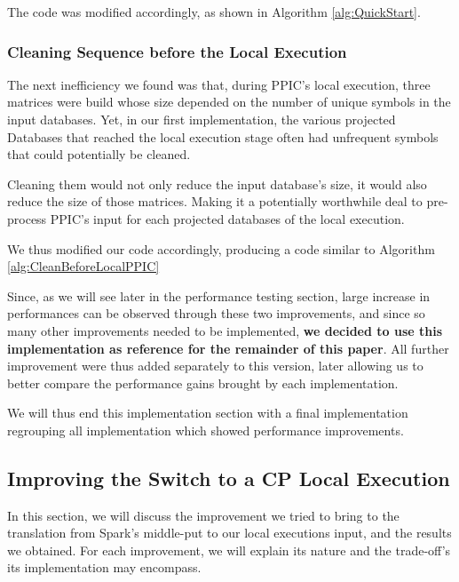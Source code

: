 \documentclass{eplmastersthesis}
\begin{document}
The code was modified accordingly, as shown in Algorithm \ref{alg:QuickStart}.

\subsubsection{Cleaning Sequence before the Local Execution}

The next inefficiency we found was that, during PPIC's local execution, three matrices were build whose size depended on the number of  unique symbols in the input databases.
Yet, in our first implementation, the various projected Databases that reached the local execution stage often had unfrequent symbols that could potentially be cleaned. \newline

Cleaning them would not only reduce the input database's size, it would also reduce the size of those matrices. Making it a potentially worthwhile deal to pre-process PPIC's input for each projected databases of the local execution. \newline

We thus modified our code accordingly, producing a code similar to Algorithm \ref{alg:CleanBeforeLocalPPIC} \newline

Since, as we will see later in the performance testing section, large increase in performances can be observed through these two improvements, and since so many other improvements needed to be implemented, \textbf{we decided to use this implementation as reference for the remainder of this paper}. All further improvement were thus added separately to this version, later allowing us to better compare the performance gains brought by each implementation. \newline

We will thus end this implementation section with a final implementation regrouping all implementation which showed performance improvements.

\subsection{Improving the Switch to a CP Local Execution}

In this section, we will discuss the improvement we tried to bring to the translation from Spark's middle-put to our local executions input, and the results we obtained. For each improvement, we will explain its nature and the trade-off's its implementation may encompass.
\end{document}

